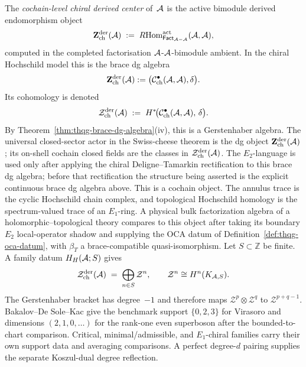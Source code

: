 \begin{definition}
\label{def:thqg-chiral-derived-center}
The \emph{cochain-level chiral derived center} of~$\mathcal{A}$ is the
active bimodule derived endomorphism object
\begin{equation}\label{eq:thqg-derived-center-rhom}
\mathbf{Z}^{\mathrm{der}}_{\mathrm{ch}}(\mathcal{A})
\;:=\;
R\!\operatorname{Hom}^{\mathrm{act}}_{\mathsf{Fact}_{\mathcal{A}-\mathcal{A}}}
(\mathcal{A},\mathcal{A}),
\end{equation}
computed in the completed factorisation \(\mathcal{A}\)-\(\mathcal{A}\)-bimodule
ambient. In the chiral Hochschild model this is the brace dg algebra
\[
\mathbf{Z}^{\mathrm{der}}_{\mathrm{ch}}(\mathcal{A})
:=
\bigl(\mathcal{C}^{\bullet}_{\mathrm{ch}}(\mathcal{A},\mathcal{A}),\delta\bigr).
\]
Its cohomology is denoted
\begin{equation}\label{eq:thqg-derived-center}
\mathcal{Z}^{\mathrm{der}}_{\mathrm{ch}}(\mathcal{A})
\;:=\;
H^*\!\bigl(\mathcal{C}^{\bullet}_{\mathrm{ch}}(\mathcal{A}, \mathcal{A}),\, \delta\bigr).
\end{equation}
By Theorem~\ref{thm:thqg-brace-dg-algebra}(iv), this is a
Gerstenhaber algebra. The universal closed-sector actor in the
Swiss-cheese theorem is the dg object
$\mathbf{Z}^{\mathrm{der}}_{\mathrm{ch}}(\mathcal{A})$; its on-shell
cochain closed fields are the classes in
$\mathcal{Z}^{\mathrm{der}}_{\mathrm{ch}}(\mathcal{A})$.
The \(E_2\)-language is used only after applying the chiral
Deligne--Tamarkin rectification to this brace dg algebra; before that
rectification the structure being asserted is the explicit continuous
brace dg algebra above.
This is a cochain object. The annulus trace is the cyclic Hochschild
chain complex, and topological Hochschild homology is the
spectrum-valued trace of an $E_1$-ring. A physical bulk
factorization algebra of a holomorphic--topological theory compares
to this object after taking its boundary $E_2$ local-operator shadow
and supplying the OCA datum of
Definition~\ref{def:thqg-oca-datum}, with \(\beta_T\) a
brace-compatible quasi-isomorphism.
Let $S\subset\mathbb Z$ be finite.  A family datum $H_H(\mathcal{A};S)$
gives
\begin{equation}\label{eq:thqg-derived-center-family-support}
\mathcal{Z}^{\mathrm{der}}_{\mathrm{ch}}(\mathcal{A})
\;=\;
\bigoplus_{n\in S}\mathcal Z^n,
\qquad
\mathcal Z^n\cong H^n(K_{\mathcal{A},S}).
\end{equation}
The Gerstenhaber bracket has degree~$-1$ and therefore maps
$\mathcal Z^p\otimes\mathcal Z^q$ to
$\mathcal Z^{p+q-1}$.  Bakalov--De Sole--Kac give the benchmark
support $\{0,2,3\}$ for Virasoro and dimensions $(2,1,0,\ldots)$ for
the rank-one even superboson after the bounded-to-chart comparison.
Critical, minimal/admissible, and $E_1$-chiral families carry their
own support data and averaging comparisons.  A perfect degree-$d$
pairing supplies the separate Koszul-dual degree reflection.
\end{definition}

